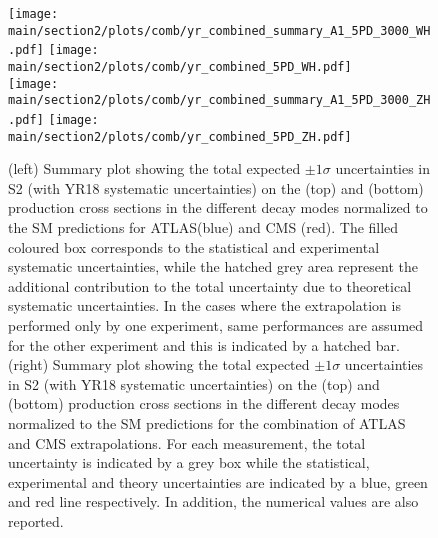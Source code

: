 \begin{figure}[hbtp]
\centering
\texttt{[image: \\main/section2/plots/comb/yr\_combined\_summary\_A1\_5PD\_3000\_WH.pdf]}%
\texttt{[image: \\main/section2/plots/comb/yr\_combined\_5PD\_WH.pdf]}\\
\texttt{[image: \\main/section2/plots/comb/yr\_combined\_summary\_A1\_5PD\_3000\_ZH.pdf]}%
\texttt{[image: \\main/section2/plots/comb/yr\_combined\_5PD\_ZH.pdf]}%
\caption{(left) Summary plot showing the total expected $\pm 1\sigma$ uncertainties in S2 (with YR18 systematic uncertainties) on the \wh (top) and \zh (bottom) production cross sections in the different decay modes normalized to the SM predictions   for ATLAS(blue)  and CMS (red). The filled coloured box corresponds to the statistical and experimental systematic uncertainties, while the hatched grey area represent the additional contribution to the total uncertainty due to theoretical systematic uncertainties. In the cases where  the extrapolation is performed only by one experiment, same performances are assumed for the other experiment and this is indicated by a  hatched bar.
(right) Summary plot showing the total expected $\pm 1\sigma$  uncertainties in S2 (with YR18 systematic uncertainties) on the \wh (top) and \zh (bottom) production cross sections in the different decay modes normalized to the SM predictions for the combination of ATLAS and CMS extrapolations. For each measurement,  the total uncertainty is indicated by a grey box while the statistical, experimental and theory uncertainties are indicated by a blue, green and red line respectively. In addition, the numerical values are also reported.}
\label{fig:summary_A1_5PD_WH_ZH}
\end{figure}


